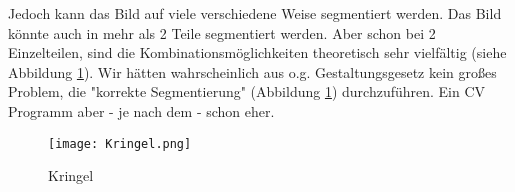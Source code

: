 \documentclass{article}
\begin{document}
Jedoch kann das Bild auf viele verschiedene Weise segmentiert werden. Das Bild könnte auch in mehr als 2 Teile segmentiert werden. Aber schon bei 2 Einzelteilen, sind die Kombinationsmöglichkeiten theoretisch sehr vielfältig (siehe Abbildung \ref{fig:fig6}). Wir hätten wahrscheinlich aus o.g. Gestaltungsgesetz kein großes Problem, die "korrekte Segmentierung" (Abbildung \ref{fig:fig6}) durchzuführen. Ein CV Programm aber - je nach dem - schon eher.

\begin{figure}
    \centering
    \texttt{[image: Kringel.png]}
    \caption{Kringel}
    \label{fig:fig6}
\end{figure}
\end{document}
